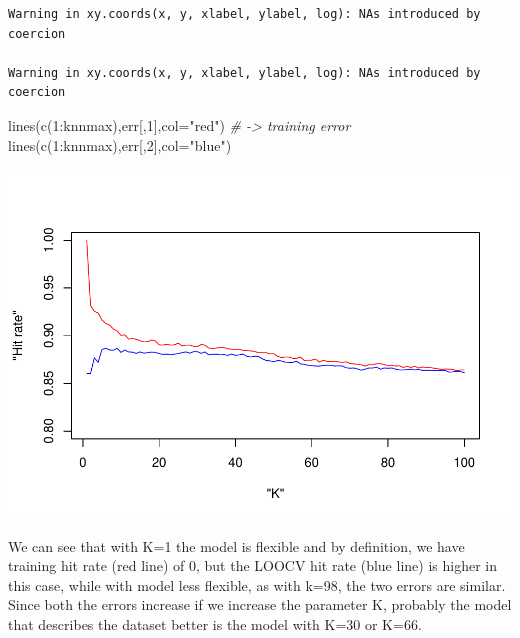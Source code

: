 \documentclass[
  11pt,
]{article}
\newenvironment{Shaded}{\begin{snugshade}}{\end{snugshade}}
\newcommand{\AttributeTok}[1]{\textcolor[rgb]{0.77,0.63,0.00}{#1}}
\newcommand{\CommentTok}[1]{\textcolor[rgb]{0.56,0.35,0.01}{\textit{#1}}}
\newcommand{\DecValTok}[1]{\textcolor[rgb]{0.00,0.00,0.81}{#1}}
\newcommand{\FunctionTok}[1]{\textcolor[rgb]{0.00,0.00,0.00}{#1}}
\newcommand{\NormalTok}[1]{#1}
\newcommand{\SpecialCharTok}[1]{\textcolor[rgb]{0.00,0.00,0.00}{#1}}
\newcommand{\StringTok}[1]{\textcolor[rgb]{0.31,0.60,0.02}{#1}}
\begin{document}
\begin{verbatim}
Warning in xy.coords(x, y, xlabel, ylabel, log): NAs introduced by coercion

Warning in xy.coords(x, y, xlabel, ylabel, log): NAs introduced by coercion
\end{verbatim}

\begin{Shaded}
\begin{Highlighting}[]
\FunctionTok{lines}\NormalTok{(}\FunctionTok{c}\NormalTok{(}\DecValTok{1}\SpecialCharTok{:}\NormalTok{knnmax),err[,}\DecValTok{1}\NormalTok{],}\AttributeTok{col=}\StringTok{"red"}\NormalTok{) }\CommentTok{\# {-}\textgreater{} training error}
\FunctionTok{lines}\NormalTok{(}\FunctionTok{c}\NormalTok{(}\DecValTok{1}\SpecialCharTok{:}\NormalTok{knnmax),err[,}\DecValTok{2}\NormalTok{],}\AttributeTok{col=}\StringTok{"blue"}\NormalTok{)}
\end{Highlighting}
\end{Shaded}

\includegraphics{report_files/figure-latex/Task_1_10-1.pdf}

We can see that with K=1 the model is flexible and by definition, we have training hit rate (red line) of 0, but the LOOCV hit rate (blue line) is higher in this case, while with model less flexible, as with k=98, the two errors are similar.
Since both the errors increase if we increase the parameter K, probably the model that describes the dataset better is the model with K=30 or K=66.
\end{document}

